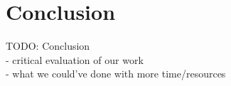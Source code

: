 \chapter{Conclusion}

TODO: Conclusion \\
- critical evaluation of our work \\
- what we could've done with more time/resources
